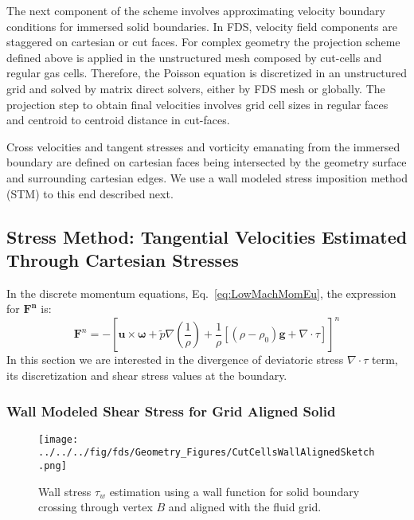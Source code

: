 The next component of the scheme involves approximating velocity boundary conditions for immersed solid boundaries. In FDS, velocity field components are staggered on cartesian or cut faces. 
For complex geometry the projection scheme defined above is applied in the unstructured mesh composed by cut-cells and regular gas cells. Therefore, the Poisson equation is discretized in an unstructured grid and solved by matrix direct solvers, either by FDS mesh or globally. The projection step to obtain final velocities involves grid cell sizes in regular faces and centroid to centroid distance in cut-faces.

Cross velocities and tangent stresses and vorticity emanating from the immersed boundary are defined on cartesian faces being intersected by the geometry surface and surrounding cartesian edges. We use a wall modeled stress imposition method (STM) to this end described next.
 
\subsection{Stress Method: Tangential Velocities Estimated Through Cartesian Stresses}

In the discrete momentum equations, Eq.~\eqref{eq:LowMachMomEu}, the expression for $\mathbf{F^n}$ is:
%
\begin{equation}
   \mathbf{F}^n = -\left[ \mathbf{u} \times \boldsymbol{\omega} + \tilde{p} \nabla \left( \frac{1}{\rho} \right) 
   + \frac{1}{\rho} \left[ (\rho-\rho_0) \mathbf{g} + \nabla \cdot \tau \right]  \right]^n \label{eqn:momfn}
\end{equation} 
%
In this section we are interested in the divergence of deviatoric stress $ \nabla \cdot \tau$ term, its discretization and shear stress values at the boundary.

\subsubsection{Wall Modeled Shear Stress for Grid Aligned Solid}

\begin{figure}[h]
      \centering
       \texttt{[image: ../../../fig/fds/Geometry\_Figures/CutCellsWallAlignedSketch.png]}
      \caption{Wall stress $\tau_w$ estimation using a wall function for solid boundary crossing through vertex $B$ and aligned with the fluid grid.}
        \label{Fig:Strss}
\end{figure}
%


